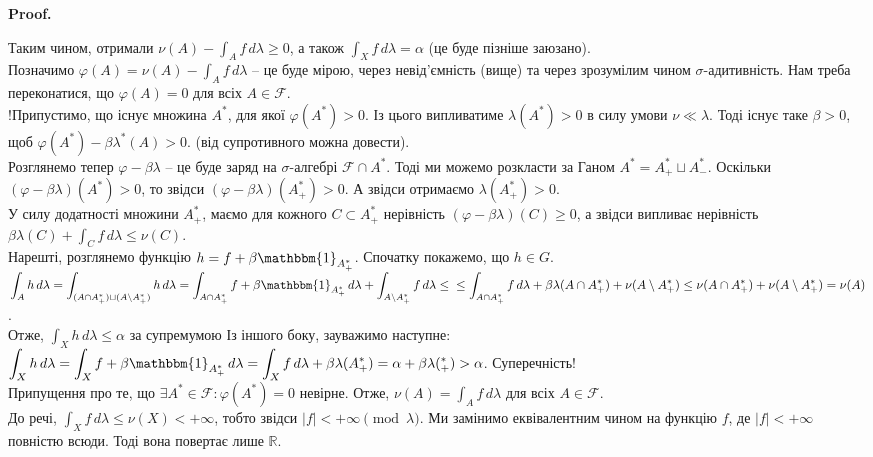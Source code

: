 \documentclass[a4paper, 10pt]{article}
\makeatletter
\theoremstyle{theoremdd}
\renewenvironment{proof}[1][Proof.\\]{\par
\pushQED{\hfill \qed}%
\normalfont \topsep6\p@\@plus6\p@\relax
\trivlist
\item\relax
{\bfseries
#1\@addpunct{.}}\hspace\labelsep\ignorespaces
}{%
\popQED\endtrivlist\@endpefalse
}
\makeatother
\begin{document}
\begin{proof}
Таким чином, отримали $\nu(A) - \displaystyle\int_A f\,d\lambda \geq 0$, а також $\displaystyle\int_X f\,d\lambda = \alpha$ (це буде пізніше заюзано).\\
Позначимо $\varphi(A) = \nu(A) - \int_A f\,d\lambda$ -- це буде мірою, через невід'ємність (вище) та через зрозумілим чином $\sigma$-адитивність. Нам треба переконатися, що $\varphi(A) = 0$ для всіх $A \in \mathcal{F}$.\\
!Припустимо, що існує множина $A^*$, для якої $\varphi(A^*) > 0$. Із цього випливатиме $\lambda(A^*) > 0$ в силу умови $\nu \ll \lambda$. Тоді існує таке $\beta >0$, щоб $\varphi(A^*) - \beta \lambda^*(A) > 0$. (від супротивного можна довести).\\
Розглянемо тепер $\varphi - \beta \lambda$ -- це буде заряд на $\sigma$-алгебрі $\mathcal{F} \cap A^*$. Тоді ми можемо розкласти за Ганом $A^* = A^*_+ \sqcup A^*_-$. Оскільки $(\varphi-\beta \lambda)(A^*) > 0$, то звідси $(\varphi-\beta \lambda)(A^*_+) > 0$. А звідси отримаємо $\lambda(A^*_+) > 0$.\\
У силу додатності множини $A^*_+$, маємо для кожного $C \subset A^*_+$ нерівність $(\varphi-\beta \lambda)(C) \geq 0$, а звідси випливає нерівність $\beta \lambda(C) + \displaystyle\int_C f\,d\lambda \leq \nu(C)$.\\
Нарешті, розглянемо функцію $h = f + \beta\mathbbm{1}_{A^*_+}$. Спочатку покажемо, що $h \in G$.\\
$\displaystyle\int_A h\,d\lambda = \int_{(A \cap A^*_+) \sqcup (A \setminus A^*_+)}h\,d\lambda = \int_{A \cap A_+^*} f+ \beta \mathbbm{1}_{A^*_+}\,d\lambda + \int_{A \setminus A_+^*} f\,d\lambda \leq \\ \leq \int_{A \cap A_+^*}f\,d\lambda + \beta \lambda(A \cap A_+^{*}) + \nu(A \setminus A_+^*) \leq \nu(A \cap A_+^*) + \nu(A \setminus A_+^*) = \nu(A)$.\\
Отже, $\displaystyle\int_X h\,d\lambda \leq \alpha$ за супремумою Із іншого боку, зауважимо наступне:\\
$\displaystyle\int_X h\,d\lambda = \int_X f + \beta \mathbbm{1}_{A^*_+}\,d\lambda = \int_X f\,d\lambda + \beta \lambda(A^*_+) = \alpha + \beta \lambda(^*_+) > \alpha$. Суперечність!\\
Припущення про те, що $\exists A^* \in \mathcal{F}: \varphi(A^*) = 0$ невірне. Отже, $\nu(A) = \displaystyle\int_A f\,d\lambda$ для всіх $A \in \mathcal{F}$.\\
До речі, $\displaystyle\int_X f\,d\lambda \leq \nu(X) < +\infty$, тобто звідси $|f| < +\infty \pmod \lambda$. Ми замінимо еквівалентним чином на функцію $f$, де $|f| < +\infty$ повністю всюди. Тоді вона повертає лише $\mathbb{R}$.

\end{proof}
\end{document}
